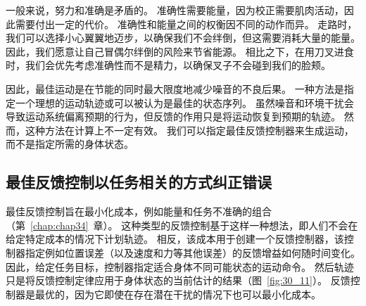 一般来说，努力和准确是矛盾的。
准确性需要能量，因为校正需要肌肉活动，因此需要付出一定的代价。
准确性和能量之间的权衡因不同的动作而异。
走路时，我们可以选择小心翼翼地迈步，以确保我们不会绊倒，但这需要消耗大量的能量。
因此，我们愿意让自己冒偶尔绊倒的风险来节省能源。
相比之下，在用刀叉进食时，我们会优先考虑准确性而不是精力，以确保叉子不会碰到我们的脸颊。


因此，最佳运动是在节能的同时最大限度地减少噪音的不良后果。
一种方法是指定一个理想的运动轨迹或可以被认为是最佳的状态序列。
虽然噪音和环境干扰会导致运动系统偏离预期的行为，但反馈的作用只是将运动恢复到预期的轨迹。
然而，这种方法在计算上不一定有效。
我们可以指定最佳反馈控制器来生成运动，而不是指定所需的身体状态。



\subsection{最佳反馈控制以任务相关的方式纠正错误}

最佳反馈控制旨在最小化成本，例如能量和任务不准确的组合（第~\ref{chap:chap34}~章）。
这种类型的反馈控制基于这样一种想法，即人们不会在给定特定成本的情况下计划轨迹。
相反，该成本用于创建一个反馈控制器，该控制器指定例如位置误差（以及速度和力等其他误差）的反馈增益如何随时间变化。
因此，给定任务目标，控制器指定适合身体不同可能状态的运动命令。
然后轨迹只是将反馈控制定律应用于身体状态的当前估计的结果（图~\ref{fig:30_11}）。
反馈控制器是最优的，因为它即使在存在潜在干扰的情况下也可以最小化成本。


